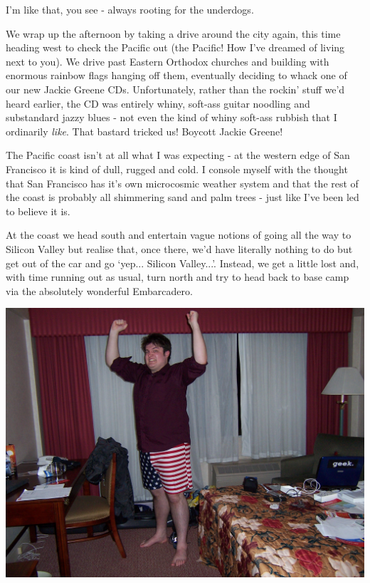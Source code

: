 \documentclass[a5paper,titlepage,11pt]{book}
\begin{document}
I'm like that, you see - always rooting for the underdogs.

We wrap up the afternoon by taking a drive around the city again, this time heading west to check the Pacific out (the Pacific! How I've dreamed of living next to you).  We drive past Eastern Orthodox churches and building with enormous rainbow flags hanging off them, eventually deciding to whack one of our new Jackie Greene CDs.  Unfortunately, rather than the rockin' stuff we'd heard earlier, the CD was entirely whiny, soft-ass guitar noodling and substandard jazzy blues - not even the kind of whiny soft-ass rubbish that I ordinarily \emph{like}.  That bastard tricked us!  Boycott Jackie Greene!

The Pacific coast isn't at all what I was expecting - at the western edge of San Francisco it is kind of dull, rugged and cold.  I console myself with the thought that San Francisco has it's own microcosmic weather system and that the rest of the coast is probably all shimmering sand and palm trees - just like I've been led to believe it is.

At the coast we head south and entertain vague notions of going all the way to Silicon Valley but realise that, once there, we'd have literally nothing to do but get out of the car and go `yep... Silicon Valley...'.  Instead, we get a little lost and, with time running out as usual, turn north and try to head back to base camp via the absolutely wonderful Embarcadero.

\begin{center}\includegraphics[width=\textwidth]{gfx/100_1097}\end{center}
\end{document}
